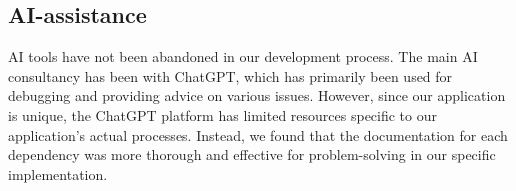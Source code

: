 
\subsection{AI-assistance}
AI tools have not been abandoned in our development process. The main AI consultancy has been with ChatGPT, which has primarily been used for debugging and providing advice on various issues. However, since our application is unique, the ChatGPT platform has limited resources specific to our application's actual processes. Instead, we found that the documentation for each dependency was more thorough and effective for problem-solving in our specific implementation.
